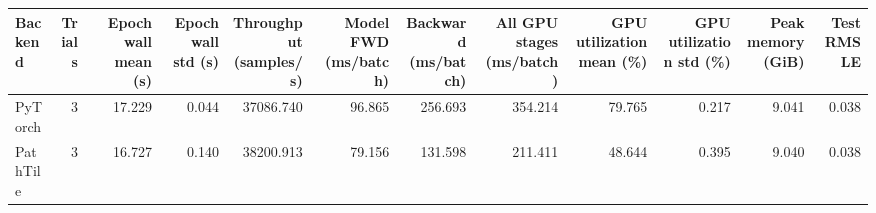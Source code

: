 \begin{tabular}{lrrrrrrrrrrr}
\toprule
Backend & Trials & Epoch wall mean (s) & Epoch wall std (s) & Throughput (samples/s) & Model FWD (ms/batch) & Backward (ms/batch) & All GPU stages (ms/batch) & GPU utilization mean (\%) & GPU utilization std (\%) & Peak memory (GiB) & Test RMSLE \\
\midrule
PyTorch & 3 & 17.229 & 0.044 & 37086.740 & 96.865 & 256.693 & 354.214 & 79.765 & 0.217 & 9.041 & 0.038 \\
PathTile & 3 & 16.727 & 0.140 & 38200.913 & 79.156 & 131.598 & 211.411 & 48.644 & 0.395 & 9.040 & 0.038 \\
\bottomrule
\end{tabular}
